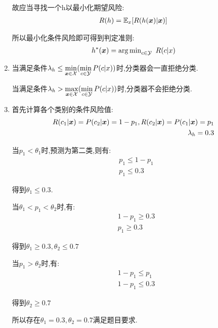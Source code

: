 \documentclass[answers]{exam}  %
\begin{document}
\begin{questions}
\begin{solution}
\begin{enumerate}
			      故应当寻找一个h以最小化期望风险:
			      \begin{align*}
				      R(h)=\mathbb{E}_x[R(h({\boldsymbol{x}})|{\boldsymbol{x}})]
			      \end{align*}

			      所以最小化条件风险即可得到判定准则:
			      \begin{align*}
				      h^*({\boldsymbol{x}})=\operatorname{arg\,min}\limits_{c\in \mathcal{Y}}\ R(c|x)
			      \end{align*}
			\item 当满足条件$\lambda_{h}\leq\min\limits_{{\boldsymbol{x}}\in\mathcal{X}}(\min\limits_{c\in\mathcal{Y}}P(c|x))$时,分类器会一直拒绝分类.

			      当满足条件$\lambda_{h}>\max\limits_{{\boldsymbol{x}}\in\mathcal{X}}(\min\limits_{c\in\mathcal{Y}}P(c|x))$时,分类器不会拒绝分类.
			\item 首先计算各个类别的条件风险值:
			      \begin{align*}
				      R(c_1|{\boldsymbol{x}})=P(c_2|{\boldsymbol{x}})=1-p_1,R(c_2|{\boldsymbol{x}})=P(c_1|{\boldsymbol{x}})=p_1 \\
				      \lambda_h=0.3
			      \end{align*}

			      当$p_1<\theta_1$时,预测为第二类,则有:
			      \begin{align*}
				       & p_1\leq 1-p_1 \\
				       & p_1\leq 0.3
			      \end{align*}

			      得到$\theta_1\leq 0.3$.

			      当$\theta_1<p_1<\theta_2$时,有:
			      \begin{align*}
				       & 1-p_1\geq 0.3 \\
				       & p_1\geq 0.3
			      \end{align*}

			      得到$\theta_1\geq 0.3,\theta_2\leq 0.7$

			      当$p_1>\theta_2$时,有:
			      \begin{align*}
				       & 1-p_1\leq p_1 \\
				       & 1-p_1\leq 0.3
			      \end{align*}

			      得到$\theta_2\geq 0.7$

			      所以存在$\theta_1=0.3,\theta_2=0.7$满足题目要求.
		\end{enumerate}
	\end{solution}


\end{questions}
\end{document}
